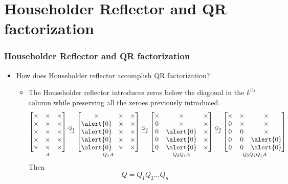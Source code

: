 \documentclass[10pt]{beamer}
\newcommand{\subitem}[1]{\begin{itemize}\item #1\end{itemize}}
\newcommand{\ith}[1]{#1^{\text{th}}}
\begin{document}
\section{Householder Reflector and QR factorization}
\begin{frame}
  \frametitle{Householder Reflector and QR factorization}
  \begin{itemize}[<+->]
    \item How does Householder reflector accomplish QR factorization?
    \subitem{The Householder reflector \alert{introduces zeros} below the diagonal in the \(\ith{k}\) column while \alert{preserving all the zeroes previously introduced.}
  \[\underset{A}{\begin{bmatrix}\times & \times & \times\\\times & \times & \times\\\times & \times & \times\\\times & \times & \times\\\times & \times & \times\\\end{bmatrix}}\overset{Q_1}{\to}
    \underset{Q_1A}{\begin{bmatrix}\times & \times & \times\\\alert{0} & \times & \times\\\alert{0} & \times & \times\\\alert{0} & \times & \times\\\alert{0} & \times & \times\\\end{bmatrix}}\overset{Q_2}{\to}
    \underset{Q_2Q_1A}{\begin{bmatrix}\times & \times & \times\\0 & \times & \times\\0 & \alert{0} & \times\\0 & \alert{0} & \times\\0 & \alert{0} & \times\\\end{bmatrix}}\overset{Q_3}{\to}
    \underset{Q_3Q_2Q_1A}{\begin{bmatrix}\times & \times & \times\\0 & \times & \times\\0 & 0 & \times\\0 & 0 & \alert{0}\\0 & 0 & \alert{0}\\\end{bmatrix}}\] Then \[Q=Q_1Q_2\hdots Q_n\]\vspace{-5mm}}
  \end{itemize}
\end{frame}
\end{document}
